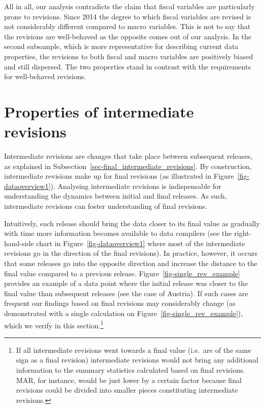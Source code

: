 \documentclass[
  letterpaper,
  authoryear,
  preprint,
  3p]{elsarticle}
\begin{document}
All in all, our analysis contradicts the claim that fiscal variables are
particularly prone to revisions. Since 2014 the degree to which fiscal
variables are revised is not considerably different compared to macro
variables. This is not to say that the revisions are well-behaved as the
opposite comes out of our analysis. In the second subsample, which is
more representative for describing current data properties, the
revisions to both fiscal and macro variables are positively biased and
still dispersed. The two properties stand in contrast with the
requirements for well-behaved revisions.


\hypertarget{sec-Intermediate-revisions}{%
\chapter{Properties of intermediate
revisions}\label{sec-Intermediate-revisions}}

Intermediate revisions are changes that take place between subsequent
releases, as explained in
Subsection~\ref{sec-final_intermediate_revisions}. By construction,
intermediate revisions make up for final revisions (as illustrated in
Figure~\ref{fig-dataoverview1}). Analysing intermediate revisions is
indispensable for understanding the dynamics between initial and final
releases. As such, intermediate revisions can foster understanding of
final revisions.

Intuitively, each release should bring the data closer to its final
value as gradually with time more information becomes available to data
compilers (see the right-hand-side chart in
Figure~\ref{fig-dataoverview1} where most of the intermediate revisions
go in the direction of the final revisions). In practice, however, it
occurs that some releases go into the opposite direction and increase
the distance to the final value compared to a previous release.
Figure~\ref{fig-single_rev_example} provides an example of a data point
where the initial release was closer to the final value than subsequent
releases (see the case of Austria). If such cases are frequent our
findings based on final revisions may considerably change (as
demonstrated with a single calculation on
Figure~\ref{fig-single_rev_example}), which we verify in this
section.\footnote{If all intermediate revisions went towards a final
  value (i.e.~are of the same sign as a final revision) intermediate
  revisions would not bring any additional information to the summary
  statistics calculated based on final revisions. MAR, for instance,
  would be just lower by a certain factor because final revisions could
  be divided into smaller pieces constituting intermediate revisions.}
\end{document}
